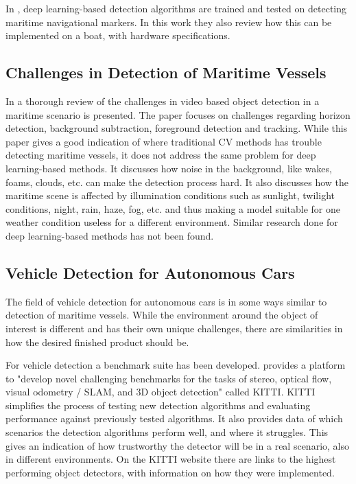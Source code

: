 \vspace{3mm}

\noindent
In \citep{Goring2017}, deep learning-based detection algorithms are trained and tested on detecting maritime navigational markers. In this work they also review how this can be implemented on a boat, with hardware specifications. 


\subsection{Challenges in Detection of Maritime Vessels}

In \citep{Challenges2016} a thorough review of the challenges in video based object detection in a maritime scenario is presented. The paper focuses on challenges regarding horizon detection, background subtraction, foreground detection and tracking. While this paper gives a good indication of where traditional CV methods has trouble detecting maritime vessels, it does not address the same problem for deep learning-based methods. It discusses how noise in the background, like wakes, foams, clouds, etc. can make the detection process hard. It also discusses how the maritime scene is affected by illumination conditions such as sunlight, twilight conditions, night, rain, haze, fog, etc. and thus making a model suitable for one weather condition useless for a different environment. Similar research done for deep learning-based methods has not been found.




\subsection{Vehicle Detection for Autonomous Cars}

The field of vehicle detection for autonomous cars is in some ways similar to detection of maritime vessels. While the environment around the object of interest is different and has their own unique challenges, there are similarities in how the desired finished product should be. 

\vspace{3mm}

\noindent
For vehicle detection a benchmark suite has been developed. \citep{KITTI} provides a platform to "develop novel challenging benchmarks for the tasks of stereo, optical flow, visual odometry / SLAM, and 3D object detection" called KITTI. KITTI simplifies the process of testing new detection algorithms and evaluating performance against previously tested algorithms. It also provides data of which scenarios the detection algorithms perform well, and where it struggles. This gives an indication of how trustworthy the detector will be in a real scenario, also in different environments. On the KITTI website there are links to the highest performing object detectors, with information on how they were implemented.

